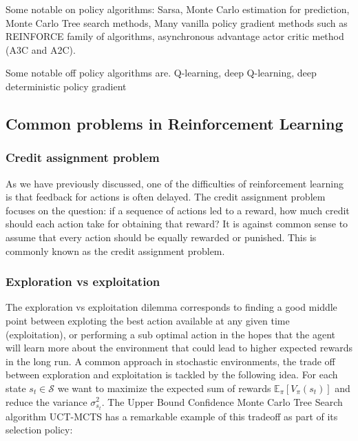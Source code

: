 \documentclass{../main.tex}{subfiles}
\begin{document}
Some notable on policy algorithms: Sarsa, Monte Carlo estimation for prediction, Monte Carlo Tree search methods,  Many vanilla policy gradient methods such as REINFORCE\citep{Williams1992} family of algorithms, asynchronous advantage actor critic method (A3C and A2C).

Some notable off policy algorithms are. Q-learning, deep Q-learning, deep deterministic policy gradient

\subsection{Common problems in Reinforcement Learning}
\subsubsection{Credit assignment problem}
As we have previously discussed, one of the difficulties of reinforcement learning is that feedback for actions is often delayed. The credit assignment problem focuses on the question: if a sequence of actions led to a reward, how much credit should each action take for obtaining that reward? It is against common sense to assume that every action should be equally rewarded or punished. This is commonly known as the credit assignment problem.
\subsubsection{Exploration vs exploitation}
The exploration vs exploitation dilemma corresponds to finding a good middle point between exploting the best action available at any given time (exploitation), or performing a sub optimal action in the hopes that the agent will learn more about the environment that could lead to higher expected rewards in the long run. A common approach in stochastic environments, the trade off between exploration and exploitation is tackled by the following idea. For each state $s_t \in \mathcal{S}$ we want to maximize the expected sum of rewards $\mathbb{E}_{\pi}[V_{\pi}(s_t)]$ and reduce the variance $\sigma^2_{s_t}$. The Upper Bound Confidence Monte Carlo Tree Search algorithm UCT-MCTS has a remarkable example of this tradeoff as part of its selection policy:
\end{document}
